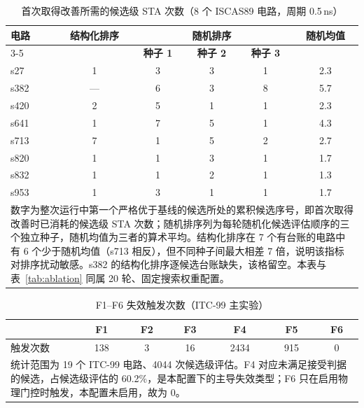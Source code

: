 \documentclass[twocolumn,10pt,fontset=windows]{ctexart}
\begin{document}
\begin{table}[!htb]
\centering
\caption{首次取得改善所需的候选级 STA 次数（8 个 ISCAS89 电路，周期 0.5\,ns）}
\label{tab:efficiency}
\scriptsize
\setlength{\tabcolsep}{2pt}
\begin{tabular}{lccccc}
\toprule
\textbf{电路} & \textbf{结构化排序} & \multicolumn{3}{c}{\textbf{随机排序}} & \textbf{随机均值} \\
\cmidrule(lr){3-5}
 & & \textbf{种子 1} & \textbf{种子 2} & \textbf{种子 3} & \\
\midrule
s27  & 1 & 3 & 3 & 1 & 2.3 \\
s382 & --- & 6 & 3 & 8 & 5.7 \\
s420 & 2 & 5 & 1 & 1 & 2.3 \\
s641 & 1 & 7 & 5 & 1 & 4.3 \\
s713 & 7 & 1 & 5 & 2 & 2.7 \\
s820 & 1 & 1 & 3 & 1 & 1.7 \\
s832 & 1 & 1 & 2 & 1 & 1.3 \\
s953 & 1 & 3 & 1 & 1 & 1.7 \\
\bottomrule
\multicolumn{6}{p{0.95\columnwidth}}{\footnotesize 数字为整次运行中第一个严格优于基线的候选所处的累积候选序号，即首次取得改善时已消耗的候选级 STA 次数；随机排序列为每轮随机化候选评估顺序的三个独立种子，随机均值为三者的算术平均。结构化排序在 7 个有台账的电路中有 6 个少于随机均值（s713 相反），但不同种子间最大相差 7 倍，说明该指标对排序扰动敏感。s382 的结构化排序逐候选台账缺失，该格留空。本表与表~\ref{tab:ablation} 同属 20 轮、固定搜索权重配置。} \\
\end{tabular}
\end{table}

\begin{table}[!htb]
\centering
\caption{F1--F6 失效触发次数（ITC-99 主实验）}
\label{tab:f16_dist}
\scriptsize
\setlength{\tabcolsep}{3pt}
\begin{tabular}{lcccccc}
\toprule
 & \textbf{F1} & \textbf{F2} & \textbf{F3} & \textbf{F4} & \textbf{F5} & \textbf{F6} \\
\midrule
触发次数 & 138 & 3 & 16 & 2434 & 915 & 0 \\
\bottomrule
\multicolumn{7}{p{0.95\columnwidth}}{\footnotesize 统计范围为 19 个 ITC-99 电路、4044 次候选级评估。F4 对应未满足接受判据的候选，占候选级评估的 60.2\%，是本配置下的主导失效类型；F6 只在启用物理门控时触发，本配置未启用，故为 0。} \\
\end{tabular}
\end{table}
\end{document}
